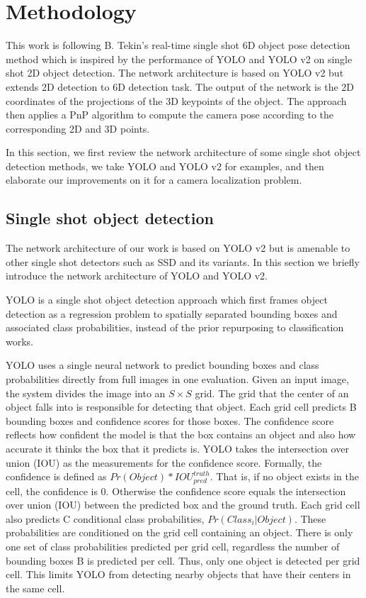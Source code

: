 \chapter{Methodology}

This work is following B. Tekin's real-time single shot 6D object pose detection method \cite{tekin2018real} which is inspired by the performance of YOLO \cite{redmon2016you} and YOLO v2 on single shot 2D object detection. The network architecture is based on YOLO v2  but extends 2D detection to 6D detection task. The output of the network is the 2D coordinates of the projections of the 3D keypoints of the object. The approach then applies a PnP algorithm to compute the camera pose according to the corresponding 2D and 3D points.

In this section, we first review the network architecture of some single shot object detection methods, we take YOLO and YOLO v2  for examples, and then elaborate our improvements on it for a camera localization problem.

\section{Single shot object detection}

The network architecture of our work is based on YOLO v2 but is amenable to other single shot detectors such as SSD and its variants. In this section we briefly introduce the network architecture of YOLO and YOLO v2.

YOLO \cite{redmon2016you} is a single shot object detection approach which first frames object detection as a regression problem to spatially separated bounding boxes and associated class probabilities, instead of the prior repurposing to classification works.

YOLO uses a single neural network to predict bounding boxes and class probabilities directly from full images in one evaluation. Given an input image, the system divides the image into an $S \times S$ grid. The grid that the center of an object falls into is responsible for detecting that object. Each grid cell predicts B bounding boxes and confidence scores for those boxes. The confidence score reflects how confident the model is that the box contains an object and also how accurate it thinks the box that it predicts is. YOLO takes the intersection over union (IOU) as the measurements for the confidence score. Formally, the confidence is defined as $Pr(Object) * IOU_{pred}^{truth}$. That is, if no object exists in the cell, the confidence is 0. Otherwise the confidence score equals the intersection over union (IOU) between the predicted box and the ground truth. Each grid cell also predicts C conditional class probabilities, $Pr(Class_{i}|Object)$. These probabilities are conditioned on the grid cell containing an object. There is only one set of class probabilities predicted per grid cell, regardless the number of bounding boxes B is predicted per cell. Thus, only one object is detected per grid cell. This limits YOLO from detecting nearby objects that have their centers in the same cell.

